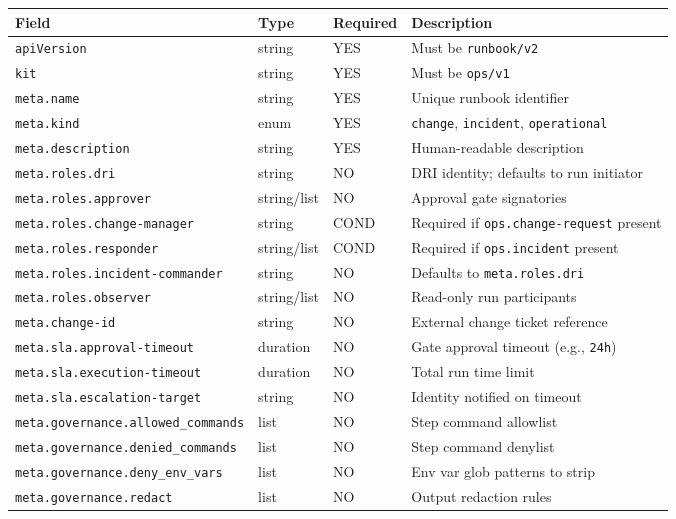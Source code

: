 \begin{center}
\small
\begin{tabular}{lllp{5.5cm}}
\textbf{Field} & \textbf{Type} & \textbf{Required} & \textbf{Description} \\
\hline
\texttt{apiVersion} & string & YES & Must be \texttt{runbook/v2} \\
\texttt{kit} & string & YES & Must be \texttt{ops/v1} \\
\texttt{meta.name} & string & YES & Unique runbook identifier \\
\texttt{meta.kind} & enum & YES & \texttt{change}, \texttt{incident}, \texttt{operational} \\
\texttt{meta.description} & string & YES & Human-readable description \\
\texttt{meta.roles.dri} & string & NO & DRI identity; defaults to run initiator \\
\texttt{meta.roles.approver} & string/list & NO & Approval gate signatories \\
\texttt{meta.roles.change-manager} & string & COND & Required if \texttt{ops.change-request} present \\
\texttt{meta.roles.responder} & string/list & COND & Required if \texttt{ops.incident} present \\
\texttt{meta.roles.incident-commander} & string & NO & Defaults to \texttt{meta.roles.dri} \\
\texttt{meta.roles.observer} & string/list & NO & Read-only run participants \\
\texttt{meta.change-id} & string & NO & External change ticket reference \\
\texttt{meta.sla.approval-timeout} & duration & NO & Gate approval timeout (e.g., \texttt{24h}) \\
\texttt{meta.sla.execution-timeout} & duration & NO & Total run time limit \\
\texttt{meta.sla.escalation-target} & string & NO & Identity notified on timeout \\
\texttt{meta.governance.allowed\_commands} & list & NO & Step command allowlist \\
\texttt{meta.governance.denied\_commands} & list & NO & Step command denylist \\
\texttt{meta.governance.deny\_env\_vars} & list & NO & Env var glob patterns to strip \\
\texttt{meta.governance.redact} & list & NO & Output redaction rules \\
\end{tabular}
\end{center}

